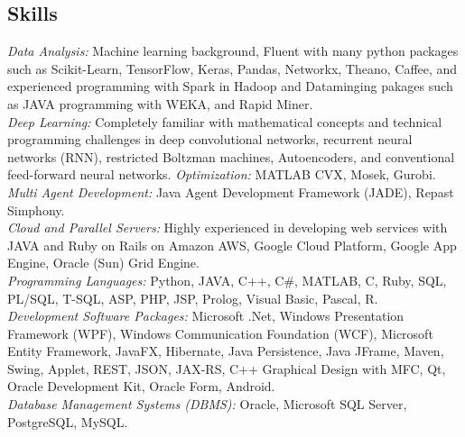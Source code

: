 \documentclass[letter]{res}
\begin{document}
\begin{resume}
		\section{Skills}
		{\sl Data Analysis: }Machine learning background, Fluent with many python packages such as Scikit-Learn, TensorFlow, Keras, Pandas, Networkx, Theano, Caffee, and experienced programming with Spark in Hadoop and Dataminging pakages such as JAVA programming with WEKA, and Rapid Miner.\\
		{\sl Deep Learning: }Completely familiar with mathematical concepts and technical programming challenges in deep convolutional networks, recurrent neural networks (RNN), restricted Boltzman machines, Autoencoders, and conventional feed-forward neural networks.
		{\sl Optimization: }MATLAB CVX, Mosek, Gurobi.\\
		{\sl Multi Agent Development: }Java Agent Development Framework (JADE), Repast Simphony.\\
		{\sl Cloud and Parallel Servers: }Highly experienced in developing web services with JAVA and Ruby on Rails on Amazon AWS, Google Cloud Platform, Google App Engine, Oracle (Sun) Grid Engine.\\
		{\sl Programming Languages: }Python, JAVA, C++, C\#, MATLAB, C, Ruby, SQL, PL/SQL, T-SQL, ASP, PHP, JSP, Prolog, Visual Basic, Pascal, R.\\
		{\sl Development Software Packages: }Microsoft .Net, Windows Presentation Framework (WPF), Windows Communication Foundation (WCF), Microsoft Entity Framework, JavaFX, Hibernate, Java Persistence, Java JFrame, Maven, Swing, Applet, REST, JSON, JAX-RS, C++ Graphical Design with MFC, Qt, Oracle Development Kit, Oracle Form, Android.\\
		{\sl Database Management Systems (DBMS): }Oracle, Microsoft SQL Server, PostgreSQL, MySQL.
		

\end{resume}
\end{document}
